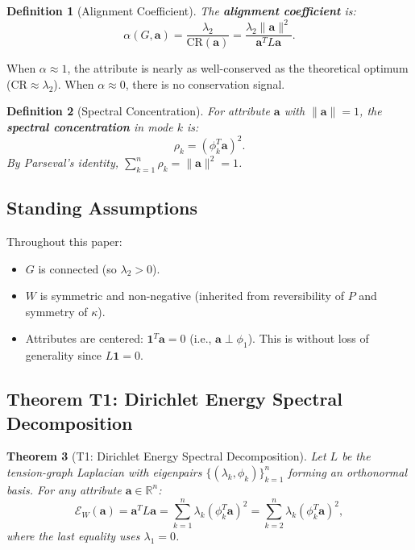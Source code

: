 \documentclass[12pt,letterpaper]{article}
\newtheorem{theorem}{Theorem}[section]
\newtheorem{definition}[theorem]{Definition}
\newcommand{\R}{\mathbb{R}}
\newcommand{\One}{\mathbf{1}}
\newcommand{\bfa}{\mathbf{a}}
\newcommand{\CR}{\mathrm{CR}}
\newcommand{\cE}{\mathcal{E}}
\begin{document}
\begin{definition}[Alignment Coefficient]
\label{def:alpha}
The \textbf{alignment coefficient} is:
\[
  \alpha(G, \bfa) = \frac{\lambda_2}{\CR(\bfa)} = \frac{\lambda_2 \|\bfa\|^2}{\bfa^T L \bfa}.
\]
\end{definition}

When $\alpha \approx 1$, the attribute is nearly as well-conserved as the theoretical optimum ($\CR \approx \lambda_2$). When $\alpha \approx 0$, there is no conservation signal.

\begin{definition}[Spectral Concentration]
\label{def:rho}
For attribute $\bfa$ with $\|\bfa\| = 1$, the \textbf{spectral concentration} in mode $k$ is:
\[
  \rho_k = (\phi_k^T \bfa)^2.
\]
By Parseval's identity, $\sum_{k=1}^{n} \rho_k = \|\bfa\|^2 = 1$.
\end{definition}

\subsection{Standing Assumptions}

Throughout this paper:
\begin{itemize}
  \item[\textbf{(A1)}] $G$ is connected (so $\lambda_2 > 0$).
  \item[\textbf{(A2)}] $W$ is symmetric and non-negative (inherited from reversibility of $P$ and symmetry of $\kappa$).
  \item[\textbf{(A3)}] Attributes are centered: $\One^T \bfa = 0$ (i.e., $\bfa \perp \phi_1$). This is without loss of generality since $L\One = 0$.
\end{itemize}

\subsection{Theorem T1: Dirichlet Energy Spectral Decomposition}
\label{sec:T1}

\begin{theorem}[T1: Dirichlet Energy Spectral Decomposition]
\label{thm:T1}
Let $L$ be the tension-graph Laplacian with eigenpairs $\{(\lambda_k, \phi_k)\}_{k=1}^n$ forming an orthonormal basis. For any attribute $\bfa \in \R^n$:
\begin{equation}
\label{eq:T1}
  \cE_W(\bfa) = \bfa^T L \bfa = \sum_{k=1}^{n} \lambda_k (\phi_k^T \bfa)^2 = \sum_{k=2}^{n} \lambda_k (\phi_k^T \bfa)^2,
\end{equation}
where the last equality uses $\lambda_1 = 0$.
\end{theorem}
\end{document}
